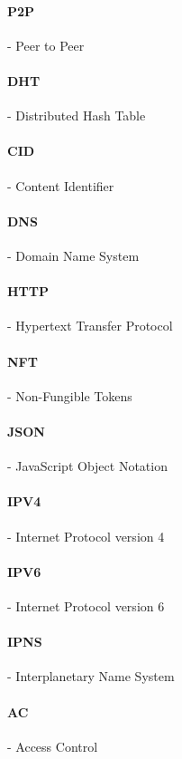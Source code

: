 \paragraph{P2P} - Peer to Peer

\paragraph{DHT} - Distributed Hash Table

\paragraph{CID} - Content Identifier

\paragraph{DNS} - Domain Name System

\paragraph{HTTP} - Hypertext Transfer Protocol

\paragraph{NFT} - Non-Fungible Tokens

\paragraph{JSON} - JavaScript Object Notation

\paragraph{IPV4} - Internet Protocol version 4

\paragraph{IPV6} - Internet Protocol version 6

\paragraph{IPNS} - Interplanetary Name System

\paragraph{AC} - Access Control

